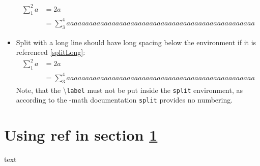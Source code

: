 \documentclass{article}
\def\ifcleveref#1{#1}%
\def\ifcleveref#1{}%
\begin{document}
\begin{itemize}
\begin{equation}
\begin{split}
					\sum_1^2 a &= 2a\\
							&= \sum_3^4 aaaaaaaaaaaaaaaaaaaaaaaaaaaaaaaaaaaaaaaaaaaaaaaaaa
				\end{split}
			\end{equation}
		\item Split with a long line should have long spacing below the environment if it is referenced \ref{splitLong}:
			\begin{equation}\label{splitLong}
				\begin{split}
					\sum_1^2 a &= 2a\\
							&= \sum_3^4 aaaaaaaaaaaaaaaaaaaaaaaaaaaaaaaaaaaaaaaaaaaaaaaaaa
				\end{split}
			\end{equation}
			Note, that the \textbackslash\texttt{label} must not be put inside the \texttt{split} environment, as according to the \AmS-math documentation \texttt{split} provides no numbering.
	\end{itemize}
	\section{Using ref in section \ref{i1}}\label{i1} text
	\ifcleveref{
		\section{Using cref in \cref{i2}}\label{i2} text
		\begin{figure}
			\caption{Ref 2: \cref{i2} and \ref{i2}}
		\end{figure}
	}
\tableofcontents
\listoffigures
\end{document}

